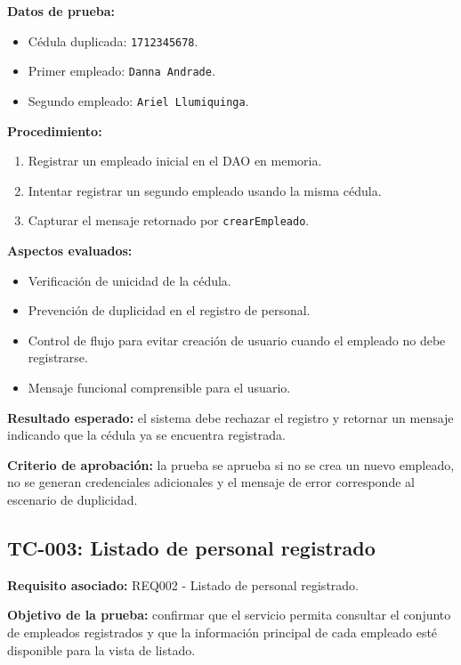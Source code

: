 \documentclass[12pt,a4paper]{article}
\begin{document}
\textbf{Datos de prueba:}
\begin{itemize}[leftmargin=*]
    \item Cédula duplicada: \texttt{1712345678}.
    \item Primer empleado: \texttt{Danna Andrade}.
    \item Segundo empleado: \texttt{Ariel Llumiquinga}.
\end{itemize}

\textbf{Procedimiento:}
\begin{enumerate}[leftmargin=*]
    \item Registrar un empleado inicial en el DAO en memoria.
    \item Intentar registrar un segundo empleado usando la misma cédula.
    \item Capturar el mensaje retornado por \texttt{crearEmpleado}.
\end{enumerate}

\textbf{Aspectos evaluados:}
\begin{itemize}[leftmargin=*]
    \item Verificación de unicidad de la cédula.
    \item Prevención de duplicidad en el registro de personal.
    \item Control de flujo para evitar creación de usuario cuando el empleado no debe registrarse.
    \item Mensaje funcional comprensible para el usuario.
\end{itemize}

\textbf{Resultado esperado:} el sistema debe rechazar el registro y retornar un mensaje indicando que la cédula ya se encuentra registrada.

\textbf{Criterio de aprobación:} la prueba se aprueba si no se crea un nuevo empleado, no se generan credenciales adicionales y el mensaje de error corresponde al escenario de duplicidad.

\subsection{TC-003: Listado de personal registrado}

\textbf{Requisito asociado:} REQ002 - Listado de personal registrado.

\textbf{Objetivo de la prueba:} confirmar que el servicio permita consultar el conjunto de empleados registrados y que la información principal de cada empleado esté disponible para la vista de listado.
\end{document}
